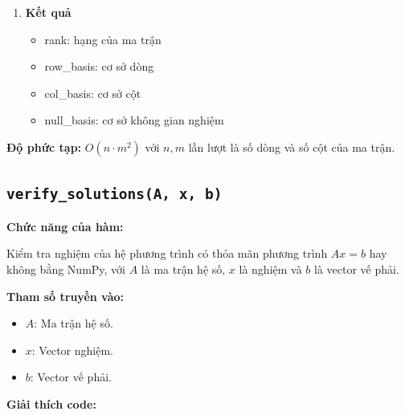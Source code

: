 \documentclass[a4paper,12pt]{report}
\begin{document}
\begin{enumerate}
\begin{lstlisting}[language=Python, caption={Cơ sở không gian nghiệm}]
M_rref = backward_elimination(M_ref, pivot_cols)

solution = solve_infinite_solutions(
    M_rref,
    pivot_cols,
    n_cols,
    epsilon=1e-12
)
\end{lstlisting}

\item \textbf{Kết quả}

\begin{itemize}
    \item rank: hạng của ma trận
    \item row\_basis: cơ sở dòng
    \item col\_basis: cơ sở cột
    \item null\_basis: cơ sở không gian nghiệm
\end{itemize}

\end{enumerate}
\textbf{Độ phức tạp:} $O(n \cdot m^2)$ với $n, m$ lần lượt là số dòng và số cột của ma trận.

\subsection[verify\_solutions(A, x, b)]{\texttt{verify\_solutions(A, x, b)}}

\textbf{Chức năng của hàm:}

Kiểm tra nghiệm của hệ phương trình có thỏa mãn phương trình $Ax = b$ hay không bằng NumPy, với $A$ là ma trận hệ số, $x$ là nghiệm và $b$ là vector vế phải.

\smallskip

\noindent\textbf{Tham số truyền vào:}
\begin{itemize}
    \item $A$: Ma trận hệ số.
    \item $x$: Vector nghiệm.
    \item $b$: Vector vế phải.
\end{itemize}

\smallskip

\noindent\textbf{Giải thích code:}
\end{document}
